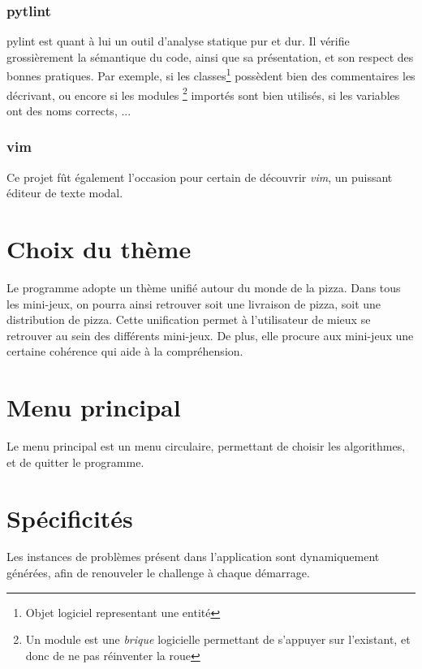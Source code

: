         \subsubsection{pytlint} pylint est quant à lui un outil d'analyse
            statique pur et dur. Il vérifie grossièrement la sémantique du code,
            ainsi que sa présentation, et son respect des bonnes pratiques.
            Par exemple, si les classes\footnote{Objet logiciel representant une entité}
            possèdent bien des commentaires les décrivant, ou encore si les modules
            \footnote{Un module est une \emph{brique} logicielle permettant
            de s'appuyer sur l'existant, et donc de ne pas réinventer la roue}
            importés sont bien utilisés, si les variables ont des noms corrects, ...
        \subsubsection{vim}
            Ce projet fût également l'occasion pour certain de découvrir \emph{vim},
            un puissant éditeur de texte modal.

\section{Choix du thème}
    Le programme adopte un thème unifié autour du monde de la pizza. Dans tous les mini-jeux, on pourra
    ainsi retrouver soit une livraison de pizza, soit une distribution de pizza. Cette unification permet à
    l'utilisateur de mieux se retrouver au sein des différents mini-jeux. De plus, elle procure aux mini-jeux
    une certaine cohérence qui aide à la compréhension.

\section{Menu principal}
    Le menu principal est un menu circulaire,
    permettant de choisir les algorithmes, et de
    quitter le programme.

\section{Spécificités} %
    Les instances de problèmes présent dans l'application
    sont dynamiquement générées, afin de renouveler
    le challenge à chaque démarrage.
